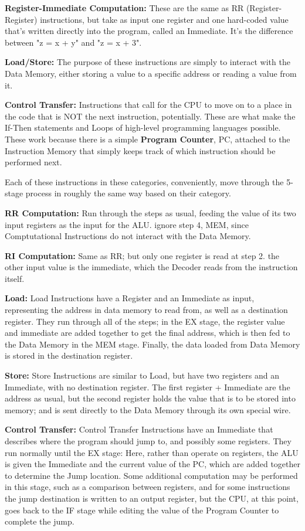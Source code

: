 \documentclass[12pt,twoside]{reedthesis}
\begin{document}
\textbf{Register-Immediate Computation:} These are the same as RR (Register-Register) instructions, but take as input one register and one hard-coded value that's written directly into the program, called an Immediate. It's the difference between "z = x + y" and "z = x + 3".

\textbf{Load/Store:} The purpose of these instructions are simply to interact with the Data Memory, either storing a value to a specific address or reading a value from it.

\textbf{Control Transfer:} Instructions that call for the CPU to move on to a place in the code that is NOT the next instruction, potentially. These are what make the If-Then statements and Loops of high-level programming languages possible. These work because there is a simple \textbf{Program Counter}, PC, attached to the Instruction Memory that simply keeps track of which instruction should be performed next.

Each of these instructions in these categories, conveniently, move through the 5-stage process in roughly the same way based on their category.

\textbf{RR Computation:} Run through the steps as usual, feeding the value of its two input registers as the input for the ALU. ignore step 4, MEM, since Comptutational Instructions do not interact with the Data Memory.

\textbf{RI Computation:} Same as RR; but only one register is read at step 2. the other input value is the immediate, which the Decoder reads from the instruction itself.

\textbf{Load:} Load Instructions have a Register and an Immediate as input, representing the address in data memory to read from, as well as a destination register. They run through all of the steps; in the EX stage, the register value and immediate are added together to get the final address, which is then fed to the Data Memory in the MEM stage. Finally, the data loaded from Data Memory is stored in the destination register.

\textbf{Store:} Store Instructions are similar to Load, but have two registers and an Immediate, with no destination register. The first register + Immediate are the address as usual, but the second register holds the value that is to be stored into memory; and is sent directly to the Data Memory through its own special wire.

\textbf{Control Transfer:} Control Transfer Instructions have an Immediate that describes where the program should jump to, and possibly some registers. They run normally until the EX stage: Here, rather than operate on registers, the ALU is given the Immediate and the current value of the PC, which are added together to determine the Jump location. Some additional computation may be performed in this stage, such as a comparison between registers, and for some instructions the jump destination is written to an output register, but the CPU, at this point, goes back to the IF stage while editing the value of the Program Counter to complete the jump.
\end{document}
